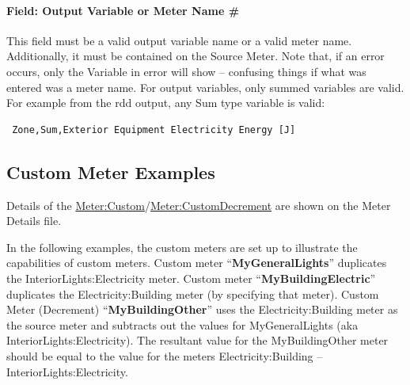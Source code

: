 \paragraph{Field: Output Variable or Meter Name \#}\label{field-output-variable-or-meter-name-1}

This field must be a valid output variable name or a valid meter name. Additionally, it must be contained on the Source Meter. Note that, if an error occurs, only the Variable in error will show -- confusing things if what was entered was a meter name. For output variables, only summed variables are valid. For example from the rdd output, any Sum type variable is valid:
\begin{lstlisting}
 Zone,Sum,Exterior Equipment Electricity Energy [J]
\end{lstlisting}

\subsection{Custom Meter Examples}\label{custom-meter-examples}

Details of the \hyperref[metercustom]{Meter:Custom}/\hyperref[metercustomdecrement]{Meter:CustomDecrement} are shown on the Meter Details file.

In the following examples, the custom meters are set up to illustrate the capabilities of custom meters. Custom meter ``\textbf{MyGeneralLights}'' duplicates the InteriorLights:Electricity meter. Custom meter ``\textbf{MyBuildingElectric}'' duplicates the Electricity:Building meter (by specifying that meter). Custom Meter (Decrement) ``\textbf{MyBuildingOther}'' uses the Electricity:Building meter as the source meter and subtracts out the values for MyGeneralLights (aka InteriorLights:Electricity). The resultant value for the MyBuildingOther meter should be equal to the value for the meters Electricity:Building -- InteriorLights:Electricity.


